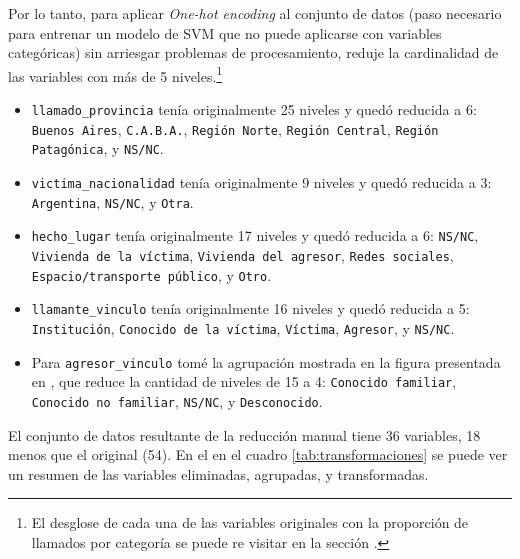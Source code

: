 \documentclass[10 pt]{article}
\begin{document}
Por lo tanto, para aplicar \textit{One-hot encoding} al conjunto de datos (paso necesario para entrenar un modelo de SVM que no puede aplicarse con variables categóricas) sin arriesgar problemas de procesamiento, reduje la cardinalidad de las variables con más de 5 niveles.\footnote{El desglose de cada una de las variables originales con la proporción de llamados por categoría se puede re visitar en la sección .}   

\begin{itemize}
    \item \texttt{llamado\_provincia} tenía originalmente 25 niveles y quedó reducida a 6: \texttt{Buenos Aires}, \texttt{C.A.B.A.}, \texttt{Región Norte}, \texttt{Región Central}, \texttt{Región Patagónica}, y \texttt{NS/NC}. 
    \item \texttt{victima\_nacionalidad} tenía originalmente 9 niveles y quedó reducida a 3: \texttt{Argentina}, \texttt{NS/NC}, y \texttt{Otra}. %
    \item \texttt{hecho\_lugar} tenía originalmente 17 niveles y quedó reducida a 6: \texttt{NS/NC}, \texttt{Vivienda de la víctima}, \texttt{Vivienda del agresor}, \texttt{Redes sociales}, \texttt{Espacio/transporte público}, %
    y \texttt{Otro}. %
    \item \texttt{llamante\_vinculo} tenía originalmente 16 niveles y quedó reducida a 5: \texttt{Institución}, %
\texttt{Conocido de la víctima}, %
\texttt{Víctima}, \texttt{Agresor}, y \texttt{NS/NC}.
\item Para \texttt{agresor\_vinculo} tomé la agrupación mostrada en la figura  presentada en , que reduce la cantidad de niveles de 15 a 4: \texttt{Conocido familiar}, \texttt{Conocido no familiar}, \texttt{NS/NC}, y \texttt{Desconocido}.
\end{itemize}


El conjunto de datos resultante de la reducción manual tiene 36 variables, 18 menos que el original (54). En el  en el cuadro \ref{tab:transformaciones} se puede ver un resumen de las variables eliminadas, agrupadas, y transformadas.
\end{document}
